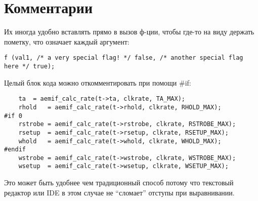 ﻿\section{Комментарии}

Их иногда удобно вставлять прямо в вызов ф-ции, чтобы где-то на виду держать пометку,
что означает каждый аргумент:

\begin{lstlisting}
f (val1, /* a very special flag! */ false, /* another special flag here */ true);
\end{lstlisting}

Целый блок кода можно откомментировать при помощи \#if:

\begin{lstlisting}
	ta	= aemif_calc_rate(t->ta, clkrate, TA_MAX);
	rhold	= aemif_calc_rate(t->rhold, clkrate, RHOLD_MAX);
#if 0	
	rstrobe	= aemif_calc_rate(t->rstrobe, clkrate, RSTROBE_MAX);
	rsetup	= aemif_calc_rate(t->rsetup, clkrate, RSETUP_MAX);
	whold	= aemif_calc_rate(t->whold, clkrate, WHOLD_MAX);
#endif	
	wstrobe	= aemif_calc_rate(t->wstrobe, clkrate, WSTROBE_MAX);
	wsetup	= aemif_calc_rate(t->wsetup, clkrate, WSETUP_MAX);
\end{lstlisting}

Это может быть удобнее чем традиционный способ потому что текстовый редактор или IDE в этом случае
не ``сломает'' отступы при выравнивании.

